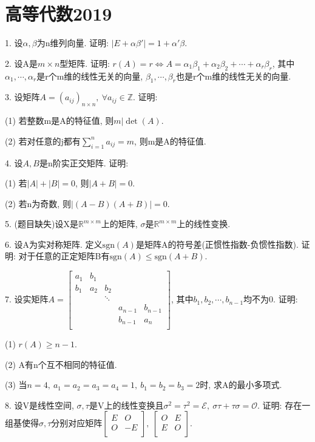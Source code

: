 \documentclass[12pt, a4paper, twoside]{ctexart}%
\begin{document}
	\section{高等代数2019}
	1. 设$\alpha,\beta$为n维列向量. 证明: $\left|E+\alpha\beta'\right|=1+\alpha'\beta$.\par 
	2. 设A是$m\times n$型矩阵. 证明: $r(A)=r\iff A=\alpha_1\beta_1+\alpha_2\beta_2+\cdots+\alpha_r\beta_r$, 其中$\alpha_1,\cdots,\alpha_r$是r个m维的线性无关的向量, $\beta_1,\cdots,\beta_r$也是r个m维的线性无关的向量.\par
	3. 设矩阵$A=\left(a_{ij}\right)_{n\times n},\ \forall a_{ij}\in \mathbb{Z}$. 证明: \par
	\hspace{1.2em}(1) 若整数m是A的特征值, 则$m\big| \det(A)$.\par 
	\hspace{1.2em}(2) 若对任意的j都有$\sum\limits_{i=1}^n a_{ij}=m$, 则m是A的特征值. \par
	4. 设$A,B$是n阶实正交矩阵. 证明: \par
	\hspace{1.2em}(1) 若$|A|+|B|=0$, 则$|A+B|=0$.\par 
	\hspace{1.2em}(2) 若n为奇数, 则$|(A-B)(A+B)|=0.$\par 
	5. (题目缺失)设X是$\mathbb{R}^{m\times m}$上的矩阵, $\sigma$是$\mathbb{R}^{m\times m}$上的线性变换.\par 
	6. 设A为实对称矩阵. 定义$\mathrm{sgn}(A)$是矩阵A的符号差(正惯性指数-负惯性指数). 证明: 对于任意的正定矩阵B有$\mathrm{sgn}(A)\leq\mathrm{sgn}(A+B)$.\par
	7. 设实矩阵$A=\begin{bmatrix}
		a_1&b_1& & &\\
		b_1&a_2&b_2& & \\
		   &   &\ddots& & \\
		   &   &   & a_{n-1}&b_{n-1}\\
		   &   &   & b_{n-1}&a_n\\
	\end{bmatrix}$, 其中$b_1,b_2,\cdots,b_{n-1}$均不为0. 证明: \par
	\hspace{1.2em}(1) $r(A)\ge n-1$.\par 
	\hspace{1.2em}(2) A有n个互不相同的特征值.\par
	\hspace{1.2em}(3) 当$n=4,\ a_1=a_2=a_3=a_4=1,\ b_1=b_2=b_3=2$时, 求A的最小多项式. \par
	8. 设V是线性空间, $\sigma,\tau$是V上的线性变换且$\sigma^2=\tau^2=\mathscr{E},\ \sigma\tau+\tau\sigma=\mathscr{O}$. 证明: 存在一组基使得$\sigma,\tau$分别对应矩阵$\begin{bmatrix}
		E&O\\
		O&-E\\
	\end{bmatrix},\ \begin{bmatrix}
	O&E\\
	E&O\\
	\end{bmatrix}$.\par 
	\clearpage 
\end{document}
